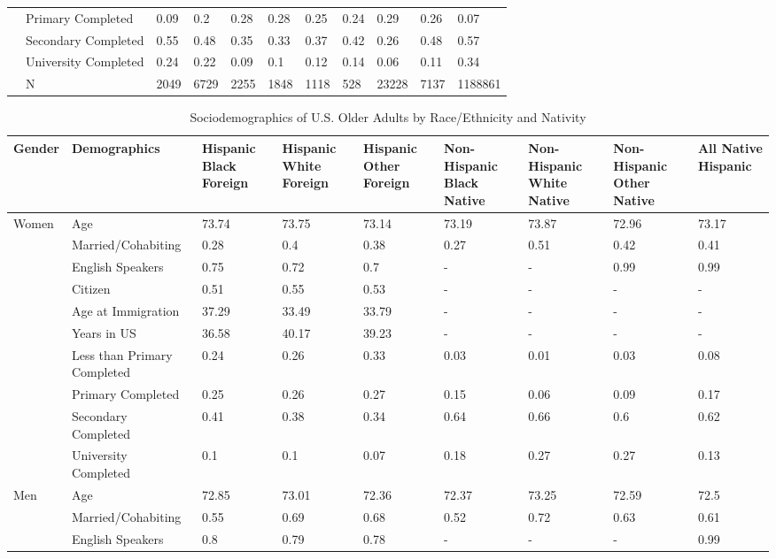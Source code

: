 \documentclass[
]{article}
\begin{document}
\begin{landscape}
\begin{table}[ht]
\begin{tabular}{l|l|lllllllll}
   & Primary Completed & 0.09 & 0.2 & 0.28 & 0.28 & 0.25 & 0.24 & 0.29 & 0.26 & 0.07 \\ 
   & Secondary Completed & 0.55 & 0.48 & 0.35 & 0.33 & 0.37 & 0.42 & 0.26 & 0.48 & 0.57 \\ 
   & University Completed & 0.24 & 0.22 & 0.09 & 0.1 & 0.12 & 0.14 & 0.06 & 0.11 & 0.34 \\ 
   & N & 2049 & 6729 & 2255 & 1848 & 1118 & 528 & 23228 & 7137 & 1188861 \\ 
   \hline
\end{tabular}
\endgroup
\end{table}

\begin{table}[ht]
\centering
\caption{Sociodemographics of U.S. Older Adults by Race/Ethnicity and Nativity} 
\begingroup\small
\begin{tabular}{l|l|p{1.5cm}p{1.5cm}p{1.5cm}p{1.5cm}p{1.5cm}p{1.5cm}p{1.5cm}}
  \hline
Gender & Demographics & Hispanic Black Foreign & Hispanic White Foreign & Hispanic Other Foreign & Non-Hispanic Black Native & Non-Hispanic White Native & Non-Hispanic Other Native & All Native Hispanic \\ 
  \hline
Women & Age & 73.74 & 73.75 & 73.14 & 73.19 & 73.87 & 72.96 & 73.17 \\ 
   & Married/Cohabiting & 0.28 & 0.4 & 0.38 & 0.27 & 0.51 & 0.42 & 0.41 \\ 
   & English Speakers & 0.75 & 0.72 & 0.7 & - & - & 0.99 & 0.99 \\ 
   & Citizen & 0.51 & 0.55 & 0.53 & - & - & - & - \\ 
   & Age at Immigration & 37.29 & 33.49 & 33.79 & - & - & - & - \\ 
   & Years in US & 36.58 & 40.17 & 39.23 & - & - & - & - \\ 
   & Less than Primary Completed & 0.24 & 0.26 & 0.33 & 0.03 & 0.01 & 0.03 & 0.08 \\ 
   & Primary Completed & 0.25 & 0.26 & 0.27 & 0.15 & 0.06 & 0.09 & 0.17 \\ 
   & Secondary Completed & 0.41 & 0.38 & 0.34 & 0.64 & 0.66 & 0.6 & 0.62 \\ 
   & University Completed & 0.1 & 0.1 & 0.07 & 0.18 & 0.27 & 0.27 & 0.13 \\ 
  Men & Age & 72.85 & 73.01 & 72.36 & 72.37 & 73.25 & 72.59 & 72.5 \\ 
   & Married/Cohabiting & 0.55 & 0.69 & 0.68 & 0.52 & 0.72 & 0.63 & 0.61 \\ 
   & English Speakers & 0.8 & 0.79 & 0.78 & - & - & - & 0.99 \\ 

\end{tabular}
\end{table}
\end{landscape}
\end{document}
